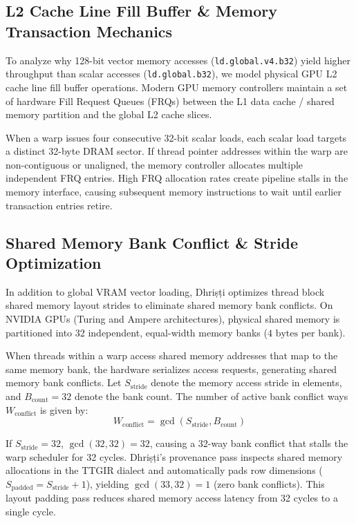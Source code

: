 \documentclass[10pt,journal,compsoc]{IEEEtran}
\begin{document}

\subsection{L2 Cache Line Fill Buffer & Memory Transaction Mechanics}
To analyze why 128-bit vector memory accesses (\texttt{ld.global.v4.b32}) yield higher throughput than scalar accesses (\texttt{ld.global.b32}), we model physical GPU L2 cache line fill buffer operations. Modern GPU memory controllers maintain a set of hardware Fill Request Queues (FRQs) between the L1 data cache / shared memory partition and the global L2 cache slices.

When a warp issues four consecutive 32-bit scalar loads, each scalar load targets a distinct 32-byte DRAM sector. If thread pointer addresses within the warp are non-contiguous or unaligned, the memory controller allocates multiple independent FRQ entries. High FRQ allocation rates create pipeline stalls in the memory interface, causing subsequent memory instructions to wait until earlier transaction entries retire.

\subsection{Shared Memory Bank Conflict \& Stride Optimization}
In addition to global VRAM vector loading, Dhri\d{s}\d{t}i optimizes thread block shared memory layout strides to eliminate shared memory bank conflicts. On NVIDIA GPUs (Turing and Ampere architectures), physical shared memory is partitioned into 32 independent, equal-width memory banks ($4\text{ bytes}$ per bank).

When threads within a warp access shared memory addresses that map to the same memory bank, the hardware serializes access requests, generating shared memory bank conflicts. Let $S_{\text{stride}}$ denote the memory access stride in elements, and $B_{\text{count}} = 32$ denote the bank count. The number of active bank conflict ways $W_{\text{conflict}}$ is given by:
\begin{equation}
W_{\text{conflict}} = \gcd(S_{\text{stride}}, B_{\text{count}})
\end{equation}

If $S_{\text{stride}} = 32$, $\gcd(32, 32) = 32$, causing a 32-way bank conflict that stalls the warp scheduler for 32 cycles. Dhri\d{s}\d{t}i's provenance pass inspects shared memory allocations in the TTGIR dialect and automatically pads row dimensions ($S_{\text{padded}} = S_{\text{stride}} + 1$), yielding $\gcd(33, 32) = 1$ (zero bank conflicts). This layout padding pass reduces shared memory access latency from 32 cycles to a single cycle.
\end{document}

